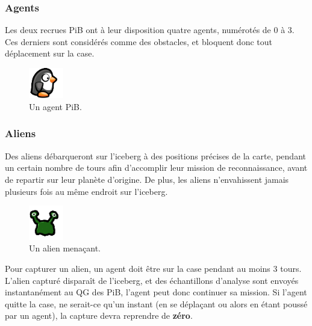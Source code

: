 \subsubsection{Agents}\label{agents}

Les deux recrues PiB ont à leur disposition quatre agents, numérotés de
0 à 3. Ces derniers sont considérés comme des obstacles, et bloquent
donc tout déplacement sur la case.

\begin{figure}[!h]
    \centering
    \includegraphics[width=1.5cm]{img/penguin}
    \caption*{Un agent PiB.}
\end{figure}

\subsubsection{Aliens}\label{aliens}

Des aliens débarqueront sur l'iceberg à des positions précises de la
carte, pendant un certain nombre de tours afin d'accomplir leur mission
de reconnaissance, avant de repartir sur leur planète d'origine. De
plus, les aliens n'envahissent jamais plusieurs fois au même endroit sur
l'iceberg.

\begin{figure}[!h]
    \centering
    \includegraphics[width=1.5cm]{img/alien}
    \caption*{Un alien menaçant.}
\end{figure}

Pour capturer un alien, un agent doit être sur la case pendant au moins
3 tours. L'alien capturé disparaît de l'iceberg, et des échantillons
d'analyse sont envoyés instantanément au QG des PiB, l'agent peut donc
continuer sa mission. Si l'agent quitte la case, ne serait-ce qu'un
instant (en se déplaçant ou alors en étant poussé par un agent), la
capture devra reprendre de \textbf{zéro}.

